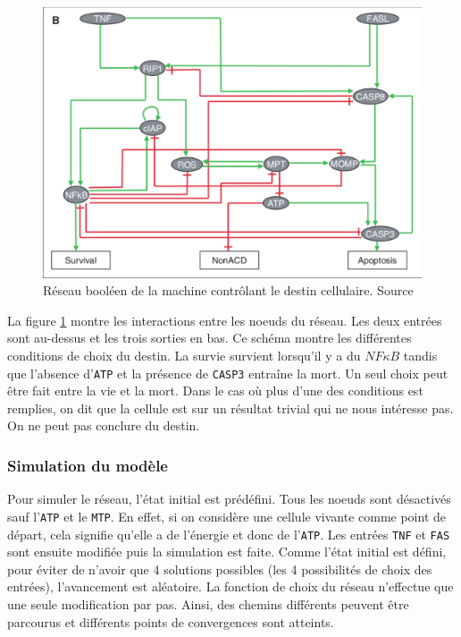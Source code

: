 \documentclass[11pt, a4paper]{article}
\begin{document}
\begin{figure}[position]
    \begin{center}
        \includegraphics[scale=0.4]{net_fadd}
        \caption{
            \label{net_fadd}
            Réseau booléen de la machine contrôlant le destin cellulaire.
            Source \cite{calzone2010}
        }
    \end{center}
\end{figure}

La figure \ref{net_fadd} montre les interactions entre les noeuds du réseau.
Les deux entrées sont au-dessus et les trois sorties en bas. Ce schéma montre
les différentes conditions de choix du destin. La survie survient lorsqu'il y a
du $NF\kappa B$ tandis que l'absence d'\texttt{ATP} et la présence de
\texttt{CASP3} entraîne la mort. Un seul choix peut être fait entre la vie et
la mort. Dans le cas où plus d'une des conditions est remplies, on dit que la
cellule est sur un résultat trivial qui ne nous intéresse pas. On ne peut pas
conclure du destin.

\subsubsection{Simulation du modèle}
Pour simuler le réseau, l'état initial est prédéfini. Tous les noeuds sont
désactivés sauf l'\texttt{ATP} et le \texttt{MTP}. En effet, si on considère
une cellule vivante comme point de départ, cela signifie qu'elle a de l'énergie
et donc de l'\texttt{ATP}. Les entrées \texttt{TNF} et \texttt{FAS} sont
ensuite modifiée puis la simulation est faite. Comme l'état initial est défini,
pour éviter de n'avoir que 4 solutions possibles (les 4 possibilités de choix
des entrées), l'avancement est aléatoire. La fonction de choix du réseau
n'effectue que une seule modification par pas. Ainsi, des chemins différents
peuvent être parcourus et différents points de convergences sont atteints.
\end{document}
